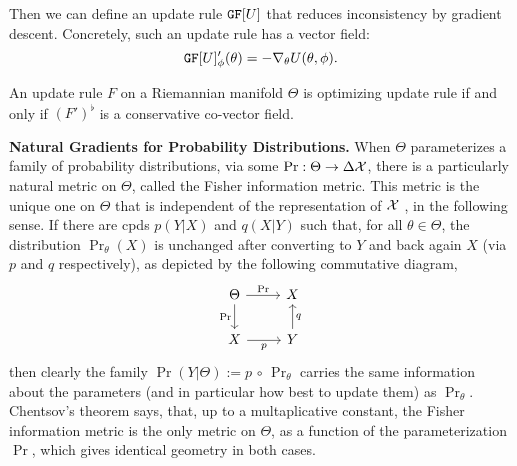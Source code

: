 \documentclass{article}
\begin{document}
Then we can define an update rule $\mathtt{GF}[U]$ that reduces inconsistency by gradient descent. Concretely, such an update rule has a vector field:
\[
    \mathtt{GF}[U]'_\phi(\theta) = - \nabla_\theta U(\theta,\phi).
\]


\begin{prop}
    An update rule $F$ on a Riemannian manifold $\Theta$ is optimizing update rule if and only if $(F')^\flat$ is a conservative co-vector field.
    \cite[Prop 11.40]{lee2013smooth}
\end{prop}

\textbf{Natural Gradients for Probability Distributions.}
When $\Theta$ parameterizes a family of probability distributions, via some $\Pr : \Theta \to \Delta \mathcal X$, there is a particularly natural metric on $\Theta$, called the Fisher information metric.
This metric is the unique one on $\Theta$ that is
independent of the representation of $\mathcal X$ \parencite{chentsov}, in the following sense.
If there are cpds $p(Y|X)$ and $q(X|Y)$ such that, for all $\theta \in \Theta$,
the distribution $\Pr_{\theta}(X)$ is unchanged after converting to $Y$ and back again $X$ (via $p$ and $q$ respectively), as depicted by the following commutative diagram,
\[
    \begin{tikzcd}
        \Theta \ar[r,"\Pr"]\ar[d,"\Pr"']
            & X \\
        X \ar[r,"p"'] & Y \ar[u, "q"']
    \end{tikzcd}
\]
then clearly the family $\Pr(Y|\Theta) := p\,\circ\,\Pr_{\theta}$ carries the same information about the parameters (and in particular how best to update them) as $\Pr_\theta$.
Chentsov's theorem says, that, up to a multaplicative constant, the Fisher information metric is the only metric on $\Theta$, as a function of the parameterization $\Pr$, which gives identical geometry in both cases.
\end{document}
